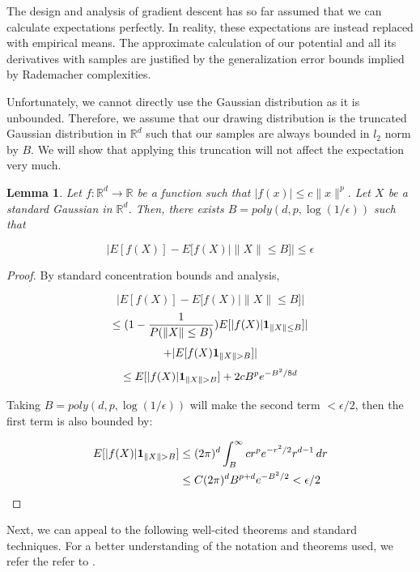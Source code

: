 \documentclass{article}
\newtheorem{lemma}[theorem]{Lemma}
\newcommand{\R}{{\mathbb{R}}}
\begin{document}
The design and analysis of gradient descent has so far assumed that we can calculate expectations perfectly. In reality, these expectations are instead replaced with empirical means. The approximate calculation of our potential and all its derivatives with samples are justified by the generalization error bounds implied by Rademacher complexities. 

Unfortunately, we cannot directly use the Gaussian distribution as it is unbounded. Therefore, we assume that our drawing distribution is the truncated Gaussian distribution in $\R^d$ such that our samples are always bounded in $l_2$ norm by $B$. We will show that applying this truncation will not affect the expectation very much.


\begin{lemma}
\label{choppedLem}
Let $f : \R^d \to \R$ be a function such that $|f(x)| \leq c\|x\|^p$. Let $X$ be a standard Gaussian in $\R^d$. Then, there exists $B = poly(d,p,\log(1/\epsilon))$ such that 

\[ |E[f(X)] - E[f(X)| \|X\|\leq B]| \leq \epsilon\]
\end{lemma}

\begin{proof}

By standard concentration bounds and analysis, 

\[|E[f(X)] - E[f(X)| \|X\|\leq B]| \]
\[\leq (1- \frac{1}{P(\|X\|\leq B)}) E[|f(X)|{\bf 1}_{\|X\|\leq B}]| \]
\[+ |E[f(X){\bf 1}_{\|X\|>B}]|\]
\[\leq E[|f(X)|{\bf 1}_{\|X\|>B}] + 2cB^pe^{-B^2/8d}\]


Taking $B = poly(d,p,\log(1/\epsilon))$ will make the second term $< \epsilon/2$, then the first term is also bounded by:

\begin{align*}
    E[|f(X)|{\bf 1}_{\|X\|>B}] &\leq (2\pi)^d \int_B^\infty cr^pe^{-r^2/2}r^{d-1}\,dr \\
    &\leq C(2\pi)^dB^{p+d}e^{-B^2/2} < \epsilon/2
\end{align*}

\end{proof}

Next, we can appeal to the following well-cited theorems and standard techniques. For a better understanding of the notation and theorems used, we refer the refer to \cite{bartlett2002rademacher}.
\end{document}
